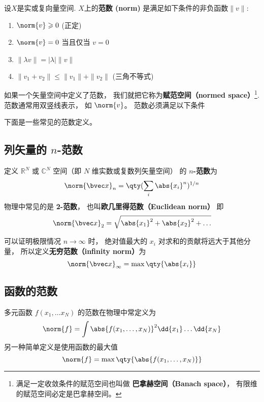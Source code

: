 

设$X$是实或复向量空间. $X$上的\textbf{范数 (norm)} 是满足如下条件的非负函数$\|v\|$:
\begin{enumerate}
\item $\norm{v} \geqslant 0$ (正定)
\item $\norm{v} = 0$ 当且仅当 $v = 0$
\item $\|\lambda v\| = |\lambda|\| v\|$
\item $\|v_1+v_2\| \leqslant \|v_1\|+ \|v_2\|$ (三角不等式)
\end{enumerate}

如果一个矢量空间中定义了范数， 我们就把它称为\textbf{赋范空间（normed space）}\footnote{满足一定收敛条件的赋范空间也叫做 \textbf{巴拿赫空间（Banach space）}， 有限维的赋范空间必定是巴拿赫空间。%
}. 范数通常用双竖线表示， 如 $\norm{v}$。 范数必须满足以下条件



下面是一些常见的范数定义。

\subsection{列矢量的 $n$-范数}
定义 $\mathbb R^N$ 或 $\mathbb C^N$ 空间（即 $N$ 维实数或复数列矢量空间） 的 \textbf{$n$-范数}为
\begin{equation}
\norm{\bvec x}_n = \qty(\sum_i \abs{x_i}^n)^{1/n}
\end{equation}
物理中常见的是 \textbf{2-范数}， 也叫\textbf{欧几里得范数（Euclidean norm）} 即
\begin{equation}
\norm{\bvec x}_2 = \sqrt{\abs{x_1}^2 + \abs{x_2}^2 + \dots}
\end{equation}

可以证明极限情况 $n \to \infty$ 时， 绝对值最大的 $x_i$ 对求和的贡献将远大于其他分量， 所以定义\textbf{无穷范数（infinity norm）}为
\begin{equation}
\norm{\bvec x}_\infty = \max \qty{\abs{x_i}}
\end{equation}

\subsection{函数的范数}
多元函数 $f(x_1, \dots x_N)$ 的范数在物理中常定义为
\begin{equation}
\norm{f} = \int \abs{f(x_1, \dots, x_N)}^2 \dd{x_1}\dots \dd{x_N}
\end{equation}
另一种简单定义是使用函数的最大值
\begin{equation}
\norm{f} = \max\qty{\abs{f(x_1, \dots, x_N)}}
\end{equation}
